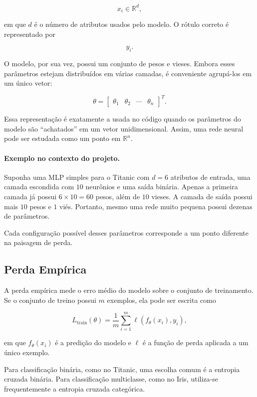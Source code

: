 \documentclass[12pt, a4paper]{article}
\begin{document}
\[
x_i \in \mathbb{R}^{d},
\]

em que \(d\) é o número de atributos usados pelo modelo. O rótulo correto é
representado por

\[
y_i.
\]

O modelo, por sua vez, possui um conjunto de pesos e vieses. Embora esses
parâmetros estejam distribuídos em várias camadas, é conveniente agrupá-los em
um único vetor:

\[
\theta =
\begin{bmatrix}
\theta_1 & \theta_2 & \cdots & \theta_n
\end{bmatrix}^{T}.
\]

Essa representação é exatamente a usada no código quando os parâmetros do
modelo são ``achatados'' em um vetor unidimensional. Assim, uma rede neural
pode ser estudada como um ponto em \(\mathbb{R}^{n}\).

\paragraph{Exemplo no contexto do projeto.}

Suponha uma MLP simples para o Titanic com \(d=6\) atributos de entrada, uma
camada escondida com \(10\) neurônios e uma saída binária. Apenas a primeira
camada já possui \(6 \times 10 = 60\) pesos, além de \(10\) vieses. A camada de
saída possui mais \(10\) pesos e \(1\) viés. Portanto, mesmo uma rede muito
pequena possui dezenas de parâmetros.

Cada configuração possível desses parâmetros corresponde a um ponto diferente
na paisagem de perda.

\subsection{Perda Empírica}

A perda empírica mede o erro médio do modelo sobre o conjunto de treinamento.
Se o conjunto de treino possui \(m\) exemplos, ela pode ser escrita como

\[
L_{\text{train}}(\theta)
=
\frac{1}{m}
\sum_{i=1}^{m}
\ell(f_{\theta}(x_i), y_i),
\]

em que \(f_{\theta}(x_i)\) é a predição do modelo e \(\ell\) é a função de
perda aplicada a um único exemplo.

Para classificação binária, como no Titanic, uma escolha comum é a entropia
cruzada binária. Para classificação multiclasse, como no Iris, utiliza-se
frequentemente a entropia cruzada categórica.
\end{document}
